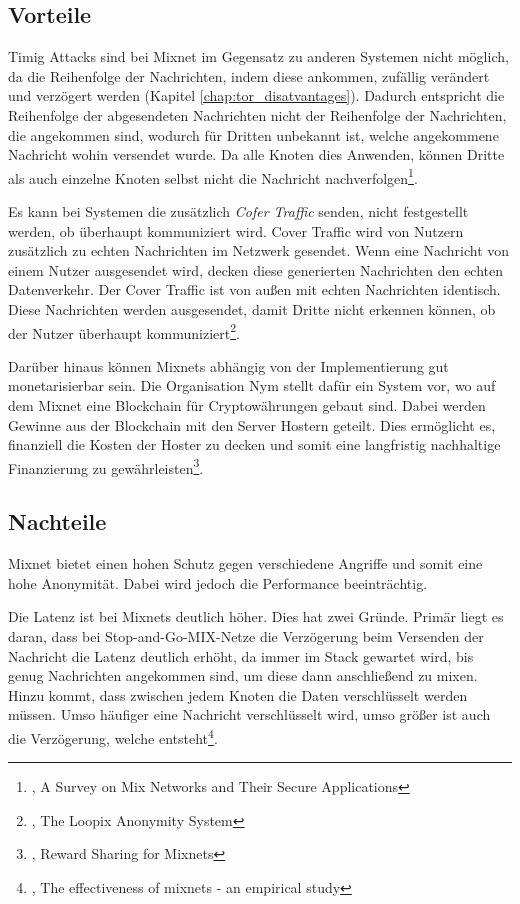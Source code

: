 \subsection{Vorteile}
\label{chap:mixnet_advantages}

Timig Attacks sind bei Mixnet im Gegensatz zu anderen Systemen nicht möglich, da die Reihenfolge der Nachrichten, indem diese ankommen, zufällig verändert und verzögert werden (Kapitel \ref{chap:tor_disatvantages}). Dadurch entspricht die Reihenfolge der abgesendeten Nachrichten nicht der Reihenfolge der Nachrichten, die angekommen sind, wodurch für Dritten unbekannt ist, welche angekommene Nachricht wohin versendet wurde. Da alle Knoten dies Anwenden, können Dritte als auch einzelne Knoten selbst nicht die Nachricht nachverfolgen\footnote{\cite{MixNetworksSecureApplications}, A Survey on Mix Networks and Their Secure Applications}.

Es kann bei Systemen die zusätzlich \textit{Cofer Traffic} senden, nicht festgestellt werden, ob überhaupt kommuniziert wird. Cover Traffic wird von Nutzern zusätzlich zu echten Nachrichten im Netzwerk gesendet. Wenn eine Nachricht von einem Nutzer ausgesendet wird, decken diese generierten Nachrichten den echten Datenverkehr. Der Cover Traffic ist von außen mit echten Nachrichten identisch. Diese Nachrichten werden ausgesendet, damit Dritte nicht erkennen können, ob der Nutzer überhaupt kommuniziert\footnote{\cite{LoopixAnonymitySystem}, The Loopix Anonymity System}.

Darüber hinaus können Mixnets abhängig von der Implementierung gut monetarisierbar sein. Die Organisation Nym stellt dafür ein System vor, wo auf dem Mixnet eine Blockchain für Cryptowährungen gebaut sind. Dabei werden Gewinne aus der Blockchain mit den Server Hostern geteilt. Dies ermöglicht es, finanziell die Kosten der Hoster zu decken und somit eine langfristig nachhaltige Finanzierung zu gewährleisten\footnote{\cite{RewardSharingForMixnets}, Reward Sharing for Mixnets}.

\subsection{Nachteile}
\label{chap:mixnet_disadvantages}

Mixnet bietet einen hohen Schutz gegen verschiedene Angriffe und somit eine hohe Anonymität. Dabei wird jedoch die Performance beeinträchtig.

Die Latenz ist bei Mixnets deutlich höher. Dies hat zwei Gründe. Primär liegt es daran, dass bei Stop-and-Go-MIX-Netze die Verzögerung beim Versenden der Nachricht die Latenz deutlich erhöht, da immer im Stack gewartet wird, bis genug Nachrichten angekommen sind, um diese dann anschließend zu mixen. Hinzu kommt, dass zwischen jedem Knoten die Daten verschlüsselt werden müssen. Umso häufiger eine Nachricht verschlüsselt wird, umso größer ist auch die Verzögerung, welche entsteht\footnote{\cite{EffectivenessOfMixnets}, The effectiveness of mixnets - an empirical study}.

